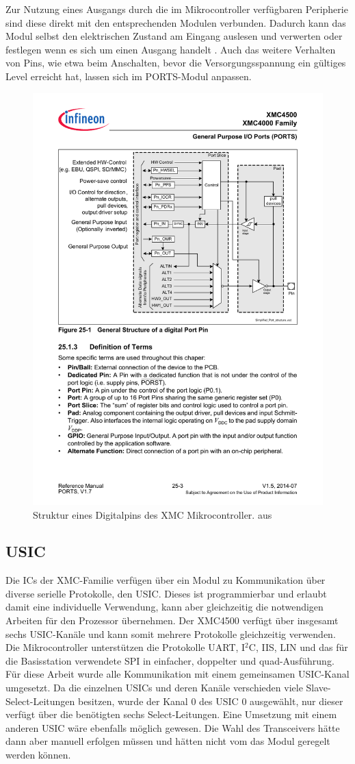Zur Nutzung eines Ausgangs durch die im Mikrocontroller verfügbaren Peripherie sind diese direkt mit den entsprechenden Modulen verbunden. Dadurch kann das Modul selbst den elektrischen Zustand am Eingang auslesen und verwerten oder festlegen wenn es sich um einen Ausgang handelt \cite{XMC-Reference}. 
Auch das weitere Verhalten von Pins, wie etwa  beim Anschalten, bevor die Versorgungsspannung ein gültiges Level erreicht hat, lassen sich im PORTS-Modul anpassen.
\begin{figure}[h]
	\centering
	\includegraphics[width=0.7\linewidth]{Abbildungen/StructureDigitalPin}
	\caption{Struktur eines Digitalpins des XMC Mikrocontroller. aus \cite{XMC-Reference}}
	\label{fig:structuredigitalpin}
\end{figure}


\subsection{USIC}
Die \acp{IC} der XMC-Familie verfügen über ein Modul zu Kommunikation über diverse serielle Protokolle, den \acf{USIC}. Dieses ist programmierbar und erlaubt damit eine individuelle Verwendung, kann aber gleichzeitig die notwendigen Arbeiten für den Prozessor übernehmen. Der XMC4500 verfügt über insgesamt sechs \ac{USIC}-Kanäle und kann somit mehrere Protokolle gleichzeitig verwenden. Die Mikrocontroller unterstützen die  Protokolle UART, I$^{2}$C, IIS, LIN und das für die Basisstation verwendete SPI in einfacher, doppelter und quad-Ausführung. Für diese Arbeit wurde alle Kommunikation mit einem gemeinsamen \acs{USIC}-Kanal umgesetzt. Da die einzelnen \acp{USIC} und deren Kanäle verschieden viele Slave-Select-Leitungen besitzen, wurde der Kanal $0$ des \ac{USIC} $0$ ausgewählt, nur dieser verfügt über die benötigten sechs Select-Leitungen. Eine Umsetzung mit einem anderen USIC wäre ebenfalls möglich gewesen. Die Wahl des Transceivers hätte dann aber manuell erfolgen müssen und hätten nicht vom das Modul geregelt werden können.


